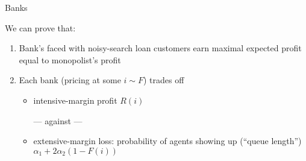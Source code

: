 \documentclass[10pt,english,slidetop,compress,
              blue,mathserif,color=option]{beamer}
\theoremstyle{plain}
\theoremstyle{definition}
\begin{document}
\begin{frame}[allowframebreaks]{Banks}

%

  \break

  We can prove that:
  \begin{enumerate}
    \item Bank's faced with noisy-search loan customers earn maximal expected profit equal to monopolist's profit

    \item Each bank (pricing at some $i \sim F$) trades off
      \begin{itemize}
        \item intensive-margin profit $R(i)$

              \medskip

              --- against ---

              \medskip

        \item extensive-margin loss: probability of agents showing up (``queue length'') $\alpha_1 + 2\alpha_2 (1-F(i))$



\end{itemize}
\end{enumerate}
\end{frame}
\end{document}
